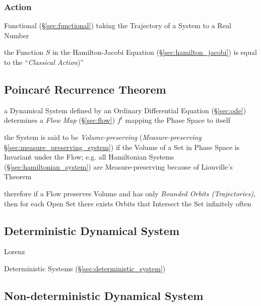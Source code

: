 \subsubsection{Action}\label{sec:trajectory_action}

Functional (\S\ref{sec:functional}) taking the Trajectory of a System to a Real
Number

the Function $S$ in the Hamilton-Jacobi Equation (\S\ref{sec:hamilton_jacobi})
is equal to the ``\emph{Classical Action})''



\subsection{Poincar\'e Recurrence Theorem}\label{sec:poincare_recurrence}

a Dynamical System defined by an Ordinary Differential Equation
(\S\ref{sec:ode}) determines a \emph{Flow Map} (\S\ref{sec:flow}) $f^t$ mapping
the Phase Space to itself

the System is said to be \emph{Volume-preserving} (\emph{Measure-preserving}
\S\ref{sec:measure_preserving_system}) if the Volume of a Set in Phase Space is
Invariant under the Flow;
e.g. all Hamiltonian Systems (\S\ref{sec:hamiltonian_system}) are
Measure-preserving because of Liouville's Theorem

therefore if a Flow preserves Volume and has only \emph{Bounded Orbits
  (Trajectories)}, then for each Open Set there exists Orbits that Intersect
the Set infinitely often



\subsection{Deterministic Dynamical System}
\label{sec:deterministic_dynamical_system}

Lorenz

\fist Deterministic Systems (\S\ref{sec:deterministic_system})



\subsection{Non-deterministic Dynamical System}
\label{sec:nondeterministic_dynamical_system}

